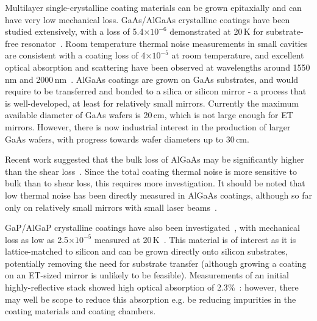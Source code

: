 Multilayer single-crystalline coating materials can be grown epitaxially and can have very low mechanical loss. GaAs/AlGaAs crystalline coatings have been studied extensively, with a loss of 5.4$\times10^{-6}$ demonstrated at 20\,K for substrate-free resonator~\cite{Cole_2012}. Room temperature thermal noise measurements in small cavities are consistent with a coating loss of 4$\times10^{-5}$ at room temperature, and excellent optical absorption and scattering have been observed at wavelengths around 1550\,nm and 2000\,nm~\cite{Cole_2016}. AlGaAs coatings are grown on GaAs substrates, and would require to be transferred and bonded to a silica or silicon mirror - a process that is well-developed, at least for relatively small mirrors. Currently the maximum available diameter of GaAs wafers is 20\,cm, which is not large enough for ET mirrors. However, there is now industrial interest in the production of larger GaAs wafers, with progress towards wafer diameters up to 30\,cm.

Recent work suggested that the bulk loss of AlGaAs may be significantly higher than the shear loss~\cite{Penn2019}. Since the total coating thermal noise is more sensitive to bulk than to shear loss, this requires more investigation. It should be noted that low thermal noise has been directly measured in AlGaAs coatings, although so far only on relatively small mirrors with small laser beams~\cite{Cole_2013}.

GaP/AlGaP crystalline coatings have also been investigated~\cite{Lin}, with mechanical loss as low as 2.5$\times10^{-5}$ measured at 20\,K~\cite{Cumming_2015}. This material is of interest as it is lattice-matched to silicon and can be grown directly onto silicon substrates, potentially removing the need for substrate transfer (although growing a coating on an ET-sized mirror is unlikely to be feasible). Measurements of an initial highly-reflective stack showed high optical absorption of 2.3$\%$~\cite{Lin_2015}: however, there may well be scope to reduce this absorption e.g. be reducing impurities in the coating materials and coating chambers.

